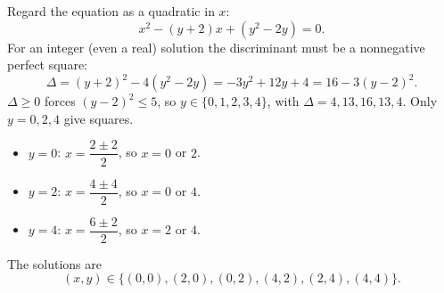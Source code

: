 Regard the equation as a quadratic in $x$:
\[
x^2-(y+2)x+(y^2-2y)=0 .
\]
For an integer (even a real) solution the discriminant must be a nonnegative perfect square:
\[
\Delta=(y+2)^2-4(y^2-2y)=-3y^2+12y+4=16-3(y-2)^2 .
\]
$\Delta\ge0$ forces $(y-2)^2\le5$, so $y\in\{0,1,2,3,4\}$, with $\Delta=4,13,16,13,4$. Only $y=0,2,4$ give squares.
\begin{itemize}
\item $y=0$: $x=\dfrac{2\pm2}{2}$, so $x=0$ or $2$.
\item $y=2$: $x=\dfrac{4\pm4}{2}$, so $x=0$ or $4$.
\item $y=4$: $x=\dfrac{6\pm2}{2}$, so $x=2$ or $4$.
\end{itemize}
The solutions are
\[
\boxed{(x,y)\in\{(0,0),(2,0),(0,2),(4,2),(2,4),(4,4)\}}.
\]
